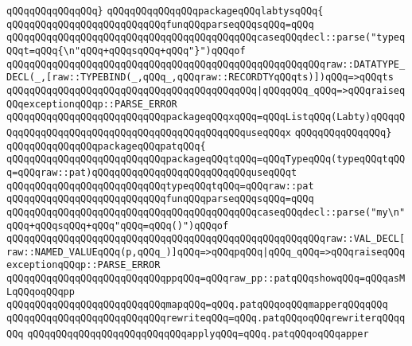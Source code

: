 \verb|qQQqqQQqqQQqqQQq}|\newline
\newline
\verb|qQQqqQQqqQQqqQQqpackageqQQqlabtysqQQq{|\newline
\newline
\verb|qQQqqQQqqQQqqQQqqQQqqQQqqQQqfunqQQqparseqQQqsqQQq=qQQq|\newline
\verb|qQQqqQQqqQQqqQQqqQQqqQQqqQQqqQQqqQQqqQQqqQQqcaseqQQqdecl::parse("typeqQQqt=qQQq{\n"qQQq+qQQqsqQQq+qQQq"}")qQQqof|\newline
\verb|qQQqqQQqqQQqqQQqqQQqqQQqqQQqqQQqqQQqqQQqqQQqqQQqqQQqqQQqraw::DATATYPE_DECL(_,[raw::TYPEBIND(_,qQQq_,qQQqraw::RECORDTYqQQqts)])qQQq=>qQQqts|\newline
\verb|qQQqqQQqqQQqqQQqqQQqqQQqqQQqqQQqqQQqqQQqqQQq|\verb#|qQQqqQQq_qQQq=>qQQqraiseqQQqexceptionqQQqp::PARSE_ERROR#\newline
\verb|qQQqqQQqqQQqqQQqqQQqqQQqqQQqpackageqQQqxqQQq=qQQqListqQQq(Labty)qQQqqQQqqQQqqQQqqQQqqQQqqQQqqQQqqQQqqQQqqQQqqQQquseqQQqx|\newline
\verb|qQQqqQQqqQQqqQQq}|\newline
\newline
\verb|qQQqqQQqqQQqqQQqpackageqQQqpatqQQq{|\newline
\newline
\verb|qQQqqQQqqQQqqQQqqQQqqQQqqQQqpackageqQQqtqQQq=qQQqTypeqQQq(typeqQQqtqQQq=qQQqraw::pat)qQQqqQQqqQQqqQQqqQQqqQQqqQQquseqQQqt|\newline
\verb|qQQqqQQqqQQqqQQqqQQqqQQqqQQqtypeqQQqtqQQq=qQQqraw::pat|\newline
\verb|qQQqqQQqqQQqqQQqqQQqqQQqqQQqfunqQQqparseqQQqsqQQq=qQQq|\newline
\verb|qQQqqQQqqQQqqQQqqQQqqQQqqQQqqQQqqQQqqQQqqQQqcaseqQQqdecl::parse("my\n"qQQq+qQQqsqQQq+qQQq"qQQq=qQQq()")qQQqof|\newline
\verb|qQQqqQQqqQQqqQQqqQQqqQQqqQQqqQQqqQQqqQQqqQQqqQQqqQQqqQQqraw::VAL_DECL[raw::NAMED_VALUEqQQq(p,qQQq_)]qQQq=>qQQqpqQQq|\verb#|qQQq_qQQq=>qQQqraiseqQQqexceptionqQQqp::PARSE_ERROR#\newline
\verb|qQQqqQQqqQQqqQQqqQQqqQQqqQQqppqQQq=qQQqraw_pp::patqQQqshowqQQq=qQQqasMLqQQqoqQQqpp|\newline
\verb|qQQqqQQqqQQqqQQqqQQqqQQqqQQqmapqQQq=qQQq.patqQQqoqQQqmapperqQQqqQQq|\newline
\verb|qQQqqQQqqQQqqQQqqQQqqQQqqQQqrewriteqQQq=qQQq.patqQQqoqQQqrewriterqQQqqQQq|\newline
\verb|qQQqqQQqqQQqqQQqqQQqqQQqqQQqapplyqQQq=qQQq.patqQQqoqQQqapper|\newline
